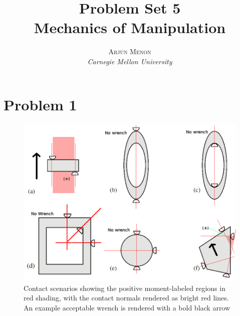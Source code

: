 \documentclass[letterpaper,10pt]{article} %
\title{\textbf{Problem Set 5}\\ %
Mechanics of Manipulation} %
\author{\textsc{Arjun Menon} %
\\{\textit{Carnegie Mellon University}}} %
\makeatletter
\renewcommand{\maketitle}{ %
\begin{flushright} %
{\LARGE\@title} %

\vspace{5pt} %

{\large\@author} %
\vspace{0pt} %
\end{flushright}
}
\makeatother
\begin{document}
\maketitle %



%
%
%


\section*{Problem 1}

\begin{figure}[h]
\centering
\includegraphics[width=\textwidth]{p1}
\caption{Contact scenarios showing the positive moment-labeled regions in red shading, with the contact normals rendered as bright red lines. An example acceptable wrench is rendered with a bold black arrow}
\label{fig:p1}
\end{figure}
\end{document}
